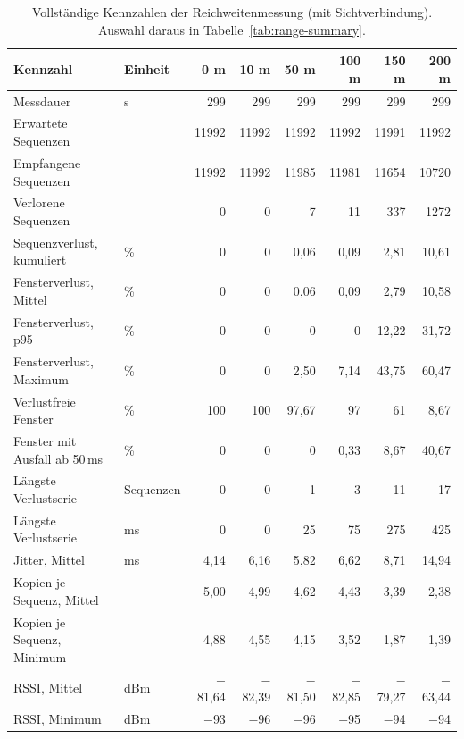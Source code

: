 \begin{table}[htbp]
  \centering
  \small
  \begin{tabular}{llrrrrrr}
    \toprule
    Kennzahl & Einheit & 0 m & 10 m & 50 m & 100 m & 150 m & 200 m \\
    \midrule
    Messdauer & s & 299 & 299 & 299 & 299 & 299 & 299 \\
    Erwartete Sequenzen &  & 11992 & 11992 & 11992 & 11992 & 11991 & 11992 \\
    Empfangene Sequenzen &  & 11992 & 11992 & 11985 & 11981 & 11654 & 10720 \\
    Verlorene Sequenzen &  & 0 & 0 & 7 & 11 & 337 & 1272 \\
    Sequenzverlust, kumuliert & \% & 0 & 0 & 0,06 & 0,09 & 2,81 & 10,61 \\
    Fensterverlust, Mittel & \% & 0 & 0 & 0,06 & 0,09 & 2,79 & 10,58 \\
    Fensterverlust, p95 & \% & 0 & 0 & 0 & 0 & 12,22 & 31,72 \\
    Fensterverlust, Maximum & \% & 0 & 0 & 2,50 & 7,14 & 43,75 & 60,47 \\
    Verlustfreie Fenster & \% & 100 & 100 & 97,67 & 97 & 61 & 8,67 \\
    Fenster mit Ausfall ab 50\,ms & \% & 0 & 0 & 0 & 0,33 & 8,67 & 40,67 \\
    Längste Verlustserie & Sequenzen & 0 & 0 & 1 & 3 & 11 & 17 \\
    Längste Verlustserie & ms & 0 & 0 & 25 & 75 & 275 & 425 \\
    Jitter, Mittel & ms & 4,14 & 6,16 & 5,82 & 6,62 & 8,71 & 14,94 \\
    Kopien je Sequenz, Mittel &  & 5,00 & 4,99 & 4,62 & 4,43 & 3,39 & 2,38 \\
    Kopien je Sequenz, Minimum &  & 4,88 & 4,55 & 4,15 & 3,52 & 1,87 & 1,39 \\
    RSSI, Mittel & dBm & $-$81,64 & $-$82,39 & $-$81,50 & $-$82,85 & $-$79,27 & $-$63,44 \\
    RSSI, Minimum & dBm & $-$93 & $-$96 & $-$96 & $-$95 & $-$94 & $-$94 \\
    \bottomrule
\end{tabular}
\caption{Vollständige Kennzahlen der Reichweitenmessung (mit Sichtverbindung). Auswahl daraus in Tabelle~\ref{tab:range-summary}.}
  \label{tab:range-full}
\end{table}
